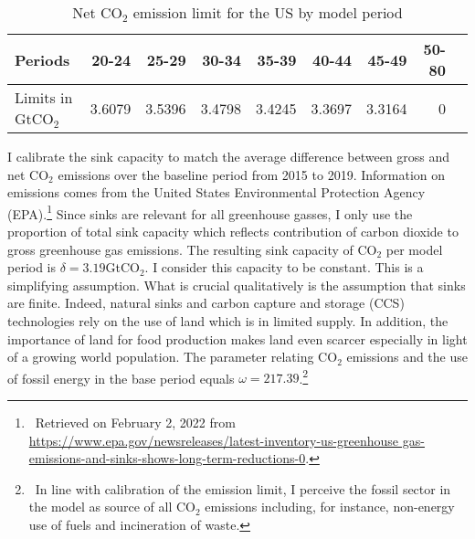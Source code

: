  \begin{table}[hh!!!!!]
	\begin{center}
		\captionsetup{width=0.9\textwidth}
		\caption{Net CO$_2$ emission limit for the US by model period}
		\label{tab:emlimit}
		\begin{tabular}{l|rrrrrrrr}
			\hline 
			\hline
			Periods&20-24&25-29&30-34&35-39&40-44&45-49&50-80\\
			\hline	
			Limits in GtCO$_2$&3.6079&3.5396&3.4798&3.4245&3.3697&3.3164&0\\
			\hline \hline
		 			
	\end{tabular}
\end{center}
\end{table}	
 I calibrate the sink capacity to match the average difference between gross and net CO$_2$ emissions over the baseline period from 2015 to 2019.  Information on emissions comes from the United States Environmental Protection Agency (EPA).\footnote{\ Retrieved on February 2, 2022 from  \url{https://www.epa.gov/newsreleases/latest-inventory-us-greenhouse gas-emissions-and-sinks-shows-long-term-reductions-0}. } Since sinks are relevant for all greenhouse gasses, I only use the proportion of total sink capacity which reflects contribution of carbon dioxide to gross greenhouse gas emissions. The resulting sink capacity of CO$_2$ per model period is $\delta=3.19$GtCO$_2$.  I consider this capacity to be constant. This is a simplifying assumption. What is crucial qualitatively is the assumption that sinks are finite. Indeed, natural sinks and carbon capture and storage (CCS) technologies rely on the use of land \citep{VanVuuren2018AlternativeTechnologies} which is in limited supply. In addition, the importance of land for food production makes land even scarcer especially in light of a growing world population.
 The parameter relating CO$_2$ emissions and the use of fossil energy in the base period equals $\omega=217.39$.\footnote{\  In line with calibration of the emission limit, I perceive the fossil sector in the model as source of all CO$_2$ emissions including, for instance, non-energy use of fuels and incineration of waste.}  
 
